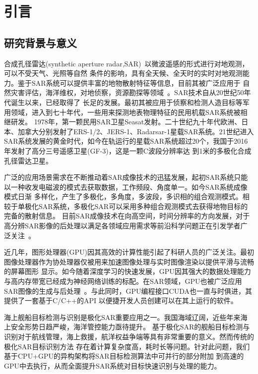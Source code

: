 \chapter{引言}
\label{cha:intro}

\section{研究背景与意义}
合成孔径雷达(synthetic aperture radar,SAR)~\cite{Knight2018Synthetic}以微波遥感的形式进行对地观测，可以不受天气、光照等自然
条件的影响，具有全天候、全天时的实时对地观测能力。鉴于SAR系统可以提供丰富的地物散射特征等信息，目前其被广泛应用于
自然灾害评估，海洋维权，对地侦察，资源勘探等领域~\cite{Moreira2013A}。SAR技术自从20世纪50年代诞生以来，已经取得了
长足的发展。最初其被应用于侦察和检测人造目标等军用领域，进入到七十年代，一些用来探测地表物理特征的民用机载SAR系统被相继研发。
1978年，第一颗民用SAR卫星Seasat发射。二十世纪九十年代欧洲、日本、加拿大分别发射了ERS-1/2、JERS-1、Radarsar-1星载SAR系统。21世纪进入
SAR系统发展的黄金时代，如今在轨运行的星载SAR系统超过20个，我国于2016年发射了高分三号遥感卫星(GF-3)，这是一颗C波段分辨率达
到1米的多极化合成孔径雷达卫星。

广泛的应用场景需求在不断推动着SAR成像技术的迅猛发展，起初SAR系统只能以一种收发电磁波的模式去获取数据，工作频段、角度单一。如今SAR系统成像模式日渐
多样化，产生了多极化，多角度，多波段，多识相的组合观测模式。相较于单极化SAR系统，多极化SAR可以采用多种组合观测模式去获得地物目标的完备的散射信息。
目前SAR成像技术在向高空间，时间分辨率的方向发展，对于高分辨SAR影像的后处理以满足各领域应用需求等前沿科学问题正在引发学者广泛关注~\cite{李德仁2012高分辨率对地观测的若干前沿科学问题}。

近几年，图形处理器(GPU)因其高效的计算性能引起了科研人员的广泛关注。最初图像处理器作为协处理器仅被用来加速图像处理与实时图像渲染以提供平滑与流畅的屏幕图形
显示。如今随着深度学习的快速发展，GPU因其强大的数据处理能力与高内存带宽已经成为神经网络训练的标配。在SAR领域，GPU也被广泛应用SAR图像的生成与后处理~\cite{Jin2012GPU,Liu2009An}。与此同时，GPU编程接口CUDA也一直与时俱进，其提供了一套基于C/C++的API
以便捷开发人员创建可以在其上运行的软件。

海上舰船目标检测与识别是极化SAR重要应用之一。我国海域辽阔，近些年来海上安全形势日趋严峻，海洋管控能力亟待提升。
基于极化SAR的舰船目标检测与识别对于航线管理，海上救援，航洋权益争端等具有非常重要的意义。然而传统的极化SAR目标识别方法
存在着计算复杂度高，耗时长等问题。针对此问题，我们基于CPU+GPU的异构架构将SAR目标检测算法中可并行的部分附加
到高速的GPU中去执行，从而全面提升SAR系统对目标快速识别与处理的能力。

